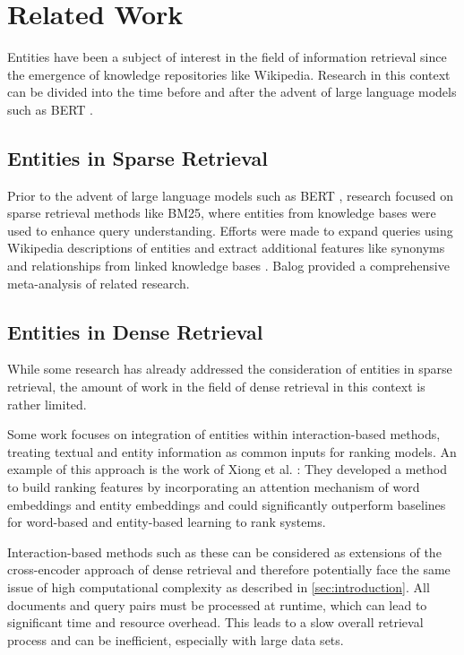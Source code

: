 \section{Related Work}\label{sec:related_work}

Entities have been a subject of interest in the field of information retrieval since the emergence of knowledge repositories like Wikipedia. Research in this context can be divided into the time before and after the advent of large language models such as BERT \cite{bert}.

\subsection{Entities in Sparse Retrieval}\label{subsec:sparse}

Prior to the advent of large language models such as BERT \cite{bert}, research focused on sparse retrieval methods like BM25, where entities from knowledge bases were used to enhance query understanding.  Efforts were made to expand queries using Wikipedia descriptions of entities \cite{xu2009query} and extract additional features like synonyms and relationships from linked knowledge bases \cite{dalton2014entity}. Balog \cite{balog2018entity} provided a comprehensive meta-analysis of related research.

\subsection{Entities in Dense Retrieval}\label{subsec:dense}

While some research has already addressed the consideration of entities in sparse retrieval, the amount of work in the field of dense retrieval in this context is rather limited. 

Some work focuses on integration of entities within interaction-based methods, treating textual and entity information as common inputs for ranking models. An example of this approach is the work of Xiong et al. \cite{xiong2017word,xiong2017word_2}: They developed a method to build ranking features by incorporating an attention mechanism of word embeddings and entity embeddings and could significantly outperform baselines for word-based and entity-based learning to rank systems.

Interaction-based methods such as these can be considered as extensions of the cross-encoder approach of dense retrieval and therefore potentially face the same issue of high computational complexity as described in \autoref{sec:introduction}. All documents and query pairs must be processed at runtime, which can lead to significant time and resource overhead. This leads to a slow overall retrieval process and can be inefficient, especially with large data sets.

